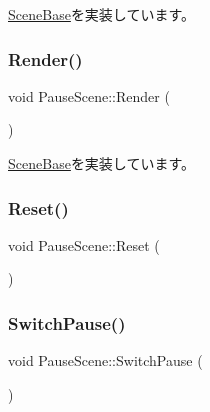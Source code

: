 \mbox{\hyperlink{class_scene_base_a24d7db43c819924dc8b07b436f6d3148}{Scene\+Base}}を実装しています。

\mbox{\label{class_pause_scene_a4eeb70d814edbe91a10e315c5e9942df}} 
\subsubsection{\texorpdfstring{Render()}{Render()}}
{\footnotesize\ttfamily void Pause\+Scene\+::\+Render (\begin{DoxyParamCaption}{ }\end{DoxyParamCaption})\hspace{0.3cm}{\ttfamily [virtual]}}



\mbox{\hyperlink{class_scene_base_ad981674ce731ea267f398e889bbb9dc3}{Scene\+Base}}を実装しています。

\mbox{\label{class_pause_scene_add74d9bcc744eaedbd6e8e10c5ee3bcc}} 
\subsubsection{\texorpdfstring{Reset()}{Reset()}}
{\footnotesize\ttfamily void Pause\+Scene\+::\+Reset (\begin{DoxyParamCaption}{ }\end{DoxyParamCaption})\hspace{0.3cm}{\ttfamily [inline]}}

\mbox{\label{class_pause_scene_acc1c366b69b6de802332b4e3d7993b41}} 
\subsubsection{\texorpdfstring{Switch\+Pause()}{SwitchPause()}}
{\footnotesize\ttfamily void Pause\+Scene\+::\+Switch\+Pause (\begin{DoxyParamCaption}{ }\end{DoxyParamCaption})\hspace{0.3cm}{\ttfamily [inline]}}

